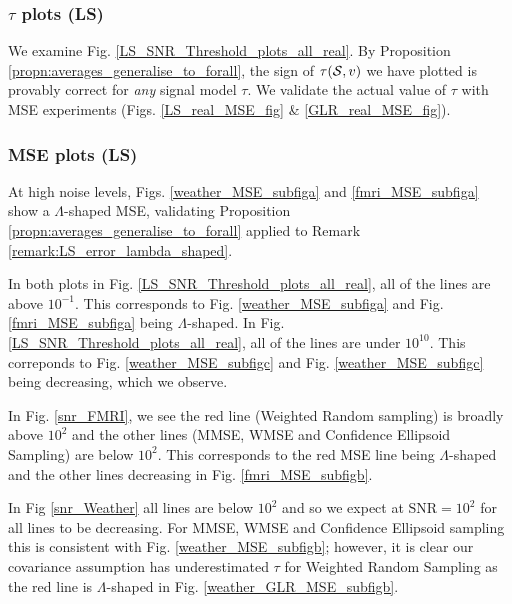 {\color{black}
\subsubsection{$\tau$ plots (LS)}
We examine Fig. \ref{LS_SNR_Threshold_plots_all_real}. By Proposition \ref{propn:averages_generalise_to_forall}, the sign of $\tau(\mathcal{S},v)$ we have plotted is provably correct for \emph{any} signal model $\tau$. 
We validate the actual value of $\tau$ with MSE experiments (Figs. \ref{LS_real_MSE_fig} \& \ref{GLR_real_MSE_fig}).


\subsubsection{MSE plots (LS)}
At high noise levels, Figs. \ref{weather_MSE_subfiga} and \ref{fmri_MSE_subfiga} show a $\Lambda$-shaped MSE, validating Proposition \ref{propn:averages_generalise_to_forall} applied to Remark \ref{remark:LS_error_lambda_shaped}. 

In both plots in Fig. \ref{LS_SNR_Threshold_plots_all_real}, all of the lines are above $10^{-1}$. This corresponds to Fig. \ref{weather_MSE_subfiga} and Fig. \ref{fmri_MSE_subfiga} being $\Lambda$-shaped. In Fig. \ref{LS_SNR_Threshold_plots_all_real}, all of the lines are under $10^{10}$. This correponds to Fig. \ref{weather_MSE_subfigc} and Fig. \ref{weather_MSE_subfigc} being decreasing, which we observe.

In Fig. \ref{snr_FMRI}, we see the red line (Weighted Random sampling) is broadly above $10^2$ and the other lines (MMSE, WMSE and Confidence Ellipsoid Sampling) are below $10^2$. This corresponds to the red MSE line being $\Lambda$-shaped and the other lines decreasing in Fig. \ref{fmri_MSE_subfigb}. 

In Fig \ref{snr_Weather} all lines are below $10^{2}$ and so we expect at $\text{SNR}=10^{2}$ for all lines to be decreasing. For MMSE, WMSE and Confidence Ellipsoid sampling this is consistent with Fig. \ref{weather_MSE_subfigb}; however, it is clear our covariance assumption has underestimated $\tau$ for Weighted Random Sampling as the red line is $\Lambda$-shaped in Fig. \ref{weather_GLR_MSE_subfigb}.


}
